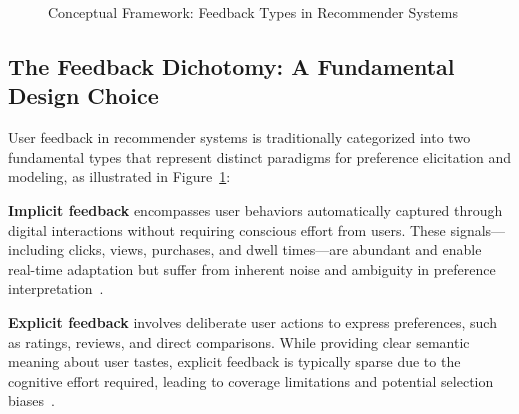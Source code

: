 \begin{figure}[ht]
\caption{Conceptual Framework: Feedback Types in Recommender Systems}
\label{fig:feedback_framework}
\end{figure}

\subsection{The Feedback Dichotomy: A Fundamental Design Choice}

User feedback in recommender systems is traditionally categorized into two fundamental types that represent distinct paradigms for preference elicitation and modeling, as illustrated in Figure~\ref{fig:feedback_framework}:

\textbf{Implicit feedback} encompasses user behaviors automatically captured through digital interactions without requiring conscious effort from users. These signals—including clicks, views, purchases, and dwell times—are abundant and enable real-time adaptation but suffer from inherent noise and ambiguity in preference interpretation~\cite{hu2008collaborative,pan2008one}.

\textbf{Explicit feedback} involves deliberate user actions to express preferences, such as ratings, reviews, and direct comparisons. While providing clear semantic meaning about user tastes, explicit feedback is typically sparse due to the cognitive effort required, leading to coverage limitations and potential selection biases~\cite{herlocker2004evaluating,adomavicius2005toward}.

